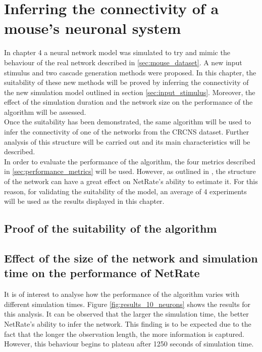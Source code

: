 
\chapter{Inferring the connectivity of a mouse's neuronal system}

In chapter 4 a neural network model was simulated to try and mimic the behaviour of the real network described in \ref{sec:mouse_dataset}. A new input stimulus and two cascade generation methods were proposed. In this chapter, the suitability of these new methods will be proved by inferring the connectivity of the new simulation model outlined in section \ref{sec:input_stimulus}. Moreover, the effect of the simulation duration and the network size on the performance of the algorithm will be assessed.\\

Once the suitability has been demonstrated, the same algorithm will be used to infer the connectivity of one of the networks from the CRCNS dataset. Further analysis of this structure will be carried out and its main characteristics will be described.\\

In order to evaluate the performance of the algorithm, the four metrics described in \ref{sec:performance_metrics} will be used. However, as outlined in \cite{pranav_report}, the structure of the network can have a great effect on NetRate's ability to estimate it. For this reason, for validating the suitability of the model, an average of 4 experiments will be used as the results displayed in this chapter.

\section{Proof of the suitability of the algorithm}\label{sec:proof_suitability}


\section{Effect of the size of the network and simulation time on the performance of NetRate}

It is of interest to analyse how the performance of the algorithm varies with different simulation times. Figure \ref{fig:results_10_neurons} shows the results for this analysis. It can be observed that the larger the simulation time, the better NetRate's ability to infer the network. This finding is to be expected due to the fact that the longer the observation length, the more information is captured. However, this behaviour begins to plateau after 1250 seconds of simulation time.\\

